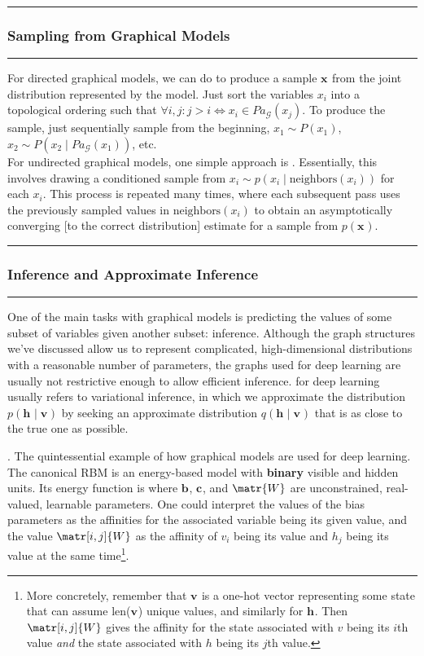 \documentclass[11pt]{article}
\renewcommand\vec[2][]{\bm{#2}_{#1}}
\newcommand\myspace[1][]{\vspace{#1\bigskipamount}}
\newcommand\p{\Needspace{10\baselineskip} \noindent}
\newcommand\subsub[1]{\Needspace{15\baselineskip}\hrule\subsubsection{#1}\hrule}
\begin{document}
\myspace{}
\subsub{Sampling from Graphical Models}
\myspace

\p For directed graphical models, we can do  to produce a sample $\vec{x}$ from the joint distribution represented by the model. Just sort the variables $x_i$ into a topological ordering such that $\forall i,j: j > i \iff x_i \in Pa_{\mathcal{G}}(x_j)$. To produce the sample, just sequentially sample from the beginning, $x_1 \sim P(x_1)$, $x_2 \sim P(x_2 \mid Pa_{\mathcal{G}}(x_1) )$, etc.\\

\p For undirected graphical models, one simple approach is . Essentially, this involves drawing a conditioned sample from $x_i \sim p(x_i \mid \text{neighbors}(x_i))$ for each $x_i$. This process is repeated many times, where each subsequent pass uses the previously sampled values in $\text{neighbors}(x_i)$ to obtain an asymptotically converging [to the correct distribution] estimate for a sample from $p(\vec{x})$.

\myspace{}
\subsub{Inference and Approximate Inference}
\myspace

\p One of the main tasks with graphical models is predicting the values of some subset of variables given another subset: inference. Although the graph structures we've discussed allow us to represent complicated, high-dimensional distributions with a reasonable number of parameters, the graphs used for deep learning are usually not restrictive enough to allow efficient inference.  for deep learning usually refers to variational inference, in which we approximate the distribution $p(\vec{h} \mid \vec{v})$ by seeking an approximate distribution $q(\vec{h} \mid \vec{v})$ that is as close to the true one as possible. 

\myspace
\p {}. The quintessential example of how graphical models are used for deep learning. The canonical RBM is an energy-based model with \textbf{binary} visible and hidden units. Its energy function is
\graybox{
	E(\vec{v}, \vec{h}) &= -\vec{b}^T\vec{v} - \vec{c}^T\vec{h} - \vec{v}^T\matr{W}\vec{h}
	}
where $\vec{b}$, $\vec{c}$, and $\matr{W}$ are unconstrained, real-valued, learnable parameters. One could interpret the values of the bias parameters as the affinities for the associated variable being its given value, and the value $\matr[i,j]{W}$ as the affinity of $v_i$ being its value and $h_j$ being its value at the same time\footnote{More concretely, remember that $\vec{v}$ is a one-hot vector representing some state that can assume len($\vec{v}$) unique values, and similarly for $\vec{h}$. Then $\matr[i,j]{W}$ gives the affinity for the state associated with $v$ being its $i$th value \textit{and} the state associated with $h$ being its $j$th value.}. \\
\end{document}
